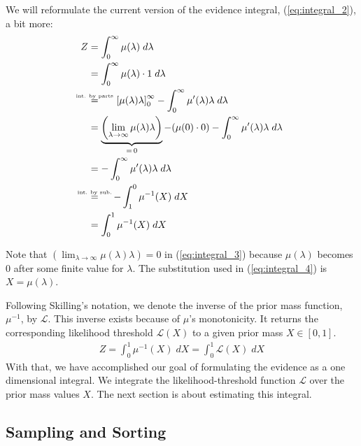 \documentclass[12pt, a4paper]{report}
\begin{document}
We will reformulate the current version of the evidence integral, (\ref{eq:integral_2}), a bit more:
\begin{align}
    Z &= \int_0^{\infty} \mu(\lambda) \; d\lambda \nonumber\\
    &= \int_0^{\infty} \mu(\lambda) \cdot 1 \; d\lambda \nonumber\\
    &\mathrel{\overset{\makebox[0pt]{\mbox{\normalfont\tiny int. by parts}}}{=}} \quad \; \; \left[\mu(\lambda) \lambda\right]_0^\infty - \int_0^\infty \mu'(\lambda)\lambda \; d\lambda \nonumber\\
    &= \underbrace{\left(\lim_{\lambda \rightarrow \infty} \mu(\lambda) \lambda\right)}_{= \, 0} - (\mu(0) \cdot 0) - \int_0^\infty \mu'(\lambda)\lambda \; d\lambda \label{eq:integral_3}\\
    &= -\int_0^\infty \mu'(\lambda)\lambda \; d\lambda \nonumber \\
    &\mathrel{\overset{\makebox[0pt]{\mbox{\normalfont\tiny int. by sub.}}}{=}} \quad \; -\int_1^0 \mu^{-1}(X) \; dX \label{eq:integral_4} \\
    &= \int_0^1 \mu^{-1}(X) \; dX \nonumber
\end{align}

Note that $\left(\lim_{\lambda \rightarrow \infty} \mu(\lambda) \lambda\right) = 0$ in (\ref{eq:integral_3}) because $\mu(\lambda)$ becomes $0$ after some finite value for $\lambda$.
The substitution used in (\ref{eq:integral_4}) is $X = \mu(\lambda)$.

Following Skilling's notation, we denote the inverse of the prior mass function, $\mu^{-1}$, by $\mathcal{L}$.
This inverse exists because of $\mu$'s monotonicity.
It returns the corresponding likelihood threshold $\mathcal{L}(X)$ to a given prior mass $X \in [0,1]$.
\begin{align}
    Z = \int_0^1 \mu^{-1}(X) \; dX = \int_0^1 \mathcal{L}(X) \; dX
    \label{eq:integral_5}
\end{align}
With that, we have accomplished our goal of formulating the evidence as a one dimensional integral.
We integrate the likelihood-threshold function $\mathcal{L}$ over the prior mass values $X$.
The next section is about estimating this integral. 


\FloatBarrier
\subsection{Sampling and Sorting}
\end{document}
